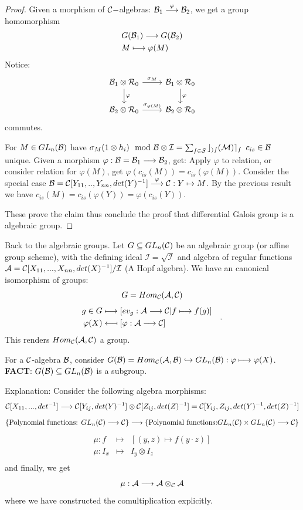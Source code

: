 \documentclass[11pt]{article}
\newcommand{\cala}{{\cal A}}
\newcommand{\calb}{{\cal B}}
\newcommand{\calc}{{\cal C}}
\newcommand{\calr}{{\cal R}}
\newcommand{\lrta}{\longrightarrow}
\newcommand{\inj}{\hookrightarrow}
\begin{document}
\begin{proof}
Given a morphism of $\calc-$algebras: $\calb_1\overset{\varphi}{\lrta}\calb_2$, we get a group homomorphism
$$
\begin{aligned}
&G(\calb_1)\lrta G(\calb_2)\\
&M\longmapsto \varphi(M)
\end{aligned}
$$
Notice:
\[
\begin{tikzcd}
\calb_1\otimes\calr_0\ar[r,"\sigma_M"]\ar[d,"\varphi"] & \calb_1\otimes \calr_0\ar[d,"\varphi"]\\
\calb_2\otimes \calr_0\ar[r,"\sigma_{\varphi(M)}"]&\calb_2\otimes \calr_0
\end{tikzcd}
\]
commutes.

For $M\in GL_n(\calb)$ have $\sigma_M(1\otimes h_i)\mod \calb\otimes \mathcal{I}=\sum_{s\in S}c_{is}(M)e_s$ $c_{is}\in \calb$ unique. Given a morphism $\varphi:\calb=\calb_1\lrta \calb_2$, get: Apply $\varphi$ to relation, or consider relation for $\varphi(M)$, get $\varphi(c_{is}(M))=c_{is}(\varphi(M))$. Consider the special case $\calb=\calc[Y_{11},..,Y_{nn},det(Y)^{-1}]\overset{\varphi}{\lrta}\calc:Y\mapsto M$. 
By the previous result we have $c_{is}(M)=c_{is}(\varphi(Y))=\varphi(c_{is}(Y))$.

 These prove the claim thus conclude the proof that differential Galois group is a algebraic group.
\end{proof}

Back to the algebraic groups. Let $G\subseteq GL_n(\calc)$ be an algebraic group (or affine group scheme), with the defining ideal $\mathcal{I}=\sqrt{\mathcal{I}}$ and algebra of regular functions $\cala=\calc[X_{11},...,X_{nn},det(X)^{-1}]/\cal{I}$ (A Hopf algebra). We have an canonical isomorphism of groups:
$$
G=Hom_\calc(\cala,\calc)
$$
$$
\begin{aligned}
g\in G&\longmapsto  [ev_g:\cala\lrta \calc|f\longmapsto f(g)]\\
\varphi(X)&\longmapsfrom [\varphi:\cala\lrta \calc]&
\end{aligned}.
$$
This renders $Hom_\calc(\cala,\calc)$ a group.

For a $\calc$-algebra $\calb$, consider $G(\calb)=Hom_\calc(\cala,\calb)\inj GL_n(\calb):\varphi\longmapsto \varphi(X)$. \\
\textbf{FACT}: $G(\calb)\subseteq GL_n(\calb)$ is a subgroup.

Explanation: Consider the following algebra morphisms:
$$
\begin{aligned}
\calc[X_{11},...,det^{-1}]\lrta \calc[Y_{ij},det(Y)^{-1}]\otimes \calc[Z_{ij},det(Z)^{-1}]=\calc[Y_{ij},Z_{ij},det(Y)^{-1},det(Z)^{-1}]
\end{aligned}
$$
$$
\{\text{Polynomial functions: $GL_n(\calc)\lrta \calc$}\}\lrta\{\text{Polynomial functions:$GL_n(\calc)\times GL_n(\calc)\lrta \calc$}\}
$$
\[
\begin{aligned}
\mu:f & \longmapsto &[(y,z)\mapsto f(y\cdot z)]\\
\mu:I_{x} &\longmapsto & I_{y}\otimes I_{z}\\
\end{aligned}
\]
and finally, we get
$$
\mu:\cala\lrta \cala\otimes_\calc \cala
$$
where we have constructed the comultiplication explicitly.
\end{document}
